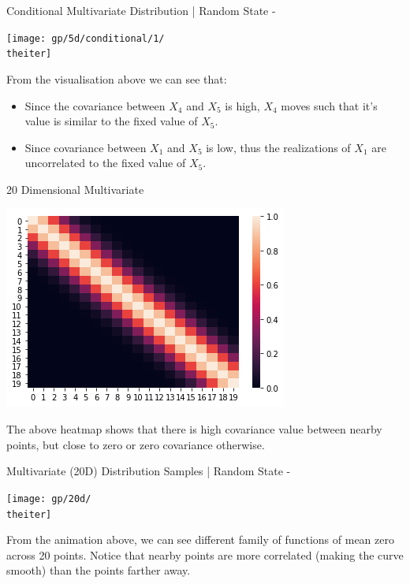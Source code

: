 \documentclass{beamer}
\begin{document}
%
{%
	\begin{frame}{Conditional Multivariate Distribution | Random State - \theiter}
		\begin{center}
			\texttt{[image: gp/5d/conditional/1/\\theiter]}
		\end{center}
		From the visualisation above we can see that:
		\begin{itemize}
			\item Since the covariance between $X_4$ and $X_5$ is high, $X_4$ moves such that it's value is similar to the fixed value of $X_5$.
			\item Since covariance between $X_1$ and $X_5$ is low, thus the realizations of $X_1$ are uncorrelated to the fixed value of $X_5$.
		\end{itemize}
	\end{frame}
}

\begin{frame}{20 Dimensional Multivariate}
	\begin{center}
		\includegraphics[width=\linewidth, height=\textheight -120pt ,keepaspectratio]{gp/20d}\\
	\end{center}	
	The above heatmap shows that there is high covariance value between nearby points, but close to zero or zero covariance otherwise.
\end{frame}

%
{%
	\begin{frame}{Multivariate (20D) Distribution Samples | Random State - \theiter}
		\begin{center}
			\texttt{[image: gp/20d/\\theiter]}
		\end{center}
		From the animation above, we can see different family of functions of mean zero across 20 points. Notice that nearby points are more correlated (making the curve smooth) than the points farther away.
	\end{frame}
}
\end{document}
